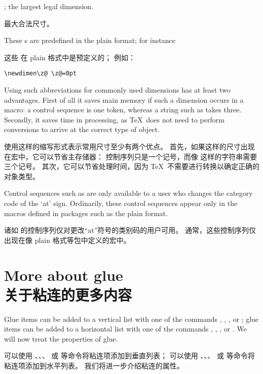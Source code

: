 \begin{inventory}
\item [\cs{z@}]
 \n{0pt}

\item [\cs{maxdimen}] 
      \n{16383.99999pt}; the largest legal dimension.

      最大合法尺寸。
\end{inventory}

These s are predefined in the plain format;
for instance 

这些  在 plain 格式中是预定义的；
例如：\begin{verbatim}
\newdimen\z@ \z@=0pt
\end{verbatim}
Using such abbreviations for commonly used dimensions
has at least two advantages. First of all it saves main memory
if such a dimension occurs in a macro: a control sequence
is one token, whereas a string such as \n{0pt} takes three.
Secondly, it saves time in processing, as \TeX\ does not need
to perform conversions to arrive at the correct type of
object.

使用这样的缩写形式表示常用尺寸至少有两个优点。
首先，如果这样的尺寸出现在宏中，它可以节省主存储器：
控制序列只是一个记号，而像 \n{0pt} 这样的字符串需要三个记号。
其次，它可以节省处理时间，因为 \TeX\ 不需要进行转换以确定正确的对象类型。

Control sequences such as 
are only available to a user who changes the
category code of the `at' sign. Ordinarily, these control sequences
appear only in the macros defined in packages such as the
plain format.

诸如  的控制序列仅对更改“at”符号的类别码的用户可用。
通常，这些控制序列仅出现在像 plain 格式等包中定义的宏中。


\section{More about glue\\关于粘连的更多内容}

Glue items can be added to a vertical list with one of the
\alt
commands , , ,  or
; 
glue items can be added to a horizontal list with one of the
commands , , ,  or
. We will now treat the properties of glue.

可以使用 、、、 或  等命令将粘连项添加到垂直列表；
可以使用 、、、 或  等命令将粘连项添加到水平列表。
我们将进一步介绍粘连的属性。

